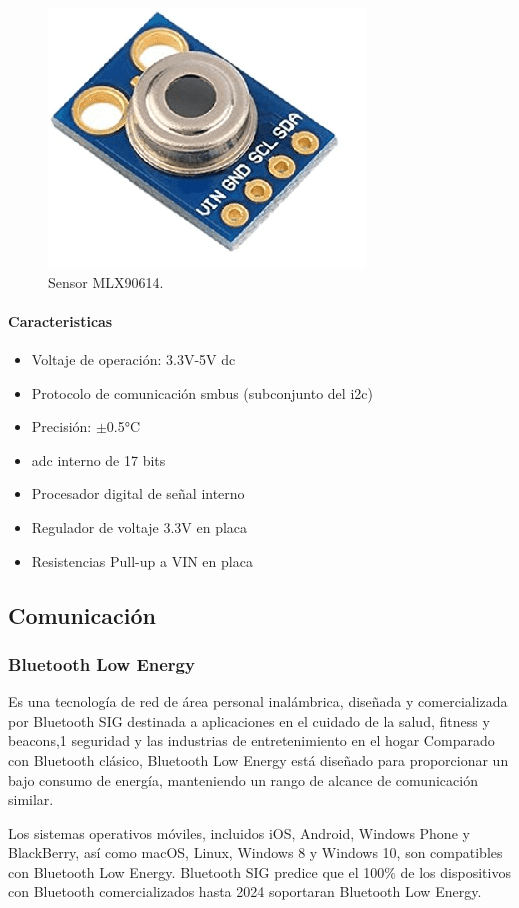 \begin{figure}[htp!]
    \centering
    \includegraphics[width = 0.25 \textwidth]{mlx90614_board.png}
    \caption{Sensor MLX90614.}
    \label{fig: sensor}
\end{figure}\FloatBarrier

\paragraph{Caracteristicas}
\begin{itemize}
    \item Voltaje de operación: 3.3V-5V \acrshort{dc}
    \item Protocolo de comunicación \acrshort{smbus} (subconjunto del \acrshort{i2c})
    \item Precisión: $ \pm $0.5°C
    \item \acrshort{adc} interno de 17 bits
    \item Procesador digital de señal interno
    \item Regulador de voltaje 3.3V en placa
    \item Resistencias Pull-up a VIN en placa
\end{itemize}

\subsection{Comunicación}
    \subsubsection{Bluetooth Low Energy}
    Es una tecnología de red de área personal inalámbrica, diseñada y comercializada por Bluetooth SIG
    destinada a aplicaciones en el cuidado de la salud, fitness y beacons,1 seguridad y las industrias
    de entretenimiento en el hogar Comparado con Bluetooth clásico, Bluetooth Low Energy está diseñado
    para proporcionar un bajo consumo de energía, manteniendo un rango de alcance de comunicación similar.

    Los sistemas operativos móviles, incluidos iOS, Android, Windows Phone y BlackBerry, así como macOS,
    Linux, Windows 8 y Windows 10, son compatibles con Bluetooth Low Energy. Bluetooth SIG predice que
    el 100\% de los dispositivos con Bluetooth comercializados hasta 2024 soportaran Bluetooth Low Energy.

